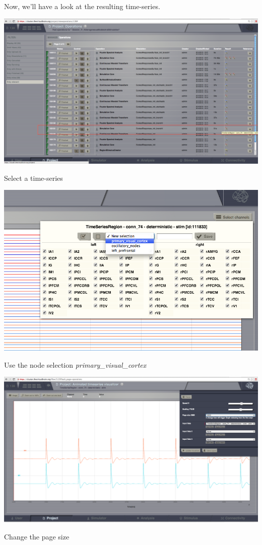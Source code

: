 \documentclass{tufte-handout}
\begin{document}
Now, we'll have a look at the resulting time-series.
\begin{marginfigure}
  \includegraphics[width=\linewidth]{Handout_UI_HeterogenousModelAndStimulation_OperationDashboard}%
  \caption{Select a time-series}%
  \label{fig:operation_dashboard}%
\end{marginfigure}
\begin{marginfigure}
  \includegraphics[width=\linewidth]{Handout_UI_HeterogenousModelAndStimulation_VisualCortex}%
  \caption{Use the node selection \textit{primary\_visual\_cortex}}%
  \label{fig:node_selection}%
\end{marginfigure}

\begin{marginfigure}
  \includegraphics[width=\linewidth]{Handout_UI_HeterogenousModelAndStimulation_AnimatedTimeSeries}%
  \caption{Change the page size}%
  \label{fig:page_size}%
\end{marginfigure}
\end{document}
